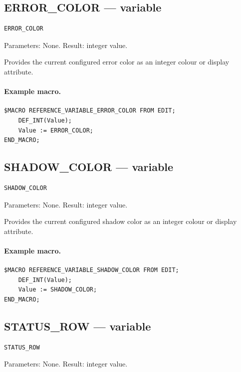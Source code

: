 \documentclass[a4paper,10pt,twoside,openany]{book}
\begin{document}
\label{prim:variable-error-color}
\subsection*{ERROR\_COLOR --- variable}
\begin{verbatim}
ERROR_COLOR
\end{verbatim}
Parameters: None. Result: integer value.

Provides the current configured error color as an integer colour or display attribute.

\paragraph{Example macro.}
\begin{verbatim}
$MACRO REFERENCE_VARIABLE_ERROR_COLOR FROM EDIT;
    DEF_INT(Value);
    Value := ERROR_COLOR;
END_MACRO;
\end{verbatim}

\label{prim:variable-shadow-color}
\subsection*{SHADOW\_COLOR --- variable}
\begin{verbatim}
SHADOW_COLOR
\end{verbatim}
Parameters: None. Result: integer value.

Provides the current configured shadow color as an integer colour or display attribute.

\paragraph{Example macro.}
\begin{verbatim}
$MACRO REFERENCE_VARIABLE_SHADOW_COLOR FROM EDIT;
    DEF_INT(Value);
    Value := SHADOW_COLOR;
END_MACRO;
\end{verbatim}

\label{prim:variable-status-row}
\subsection*{STATUS\_ROW --- variable}
\begin{verbatim}
STATUS_ROW
\end{verbatim}
Parameters: None. Result: integer value.
\end{document}
